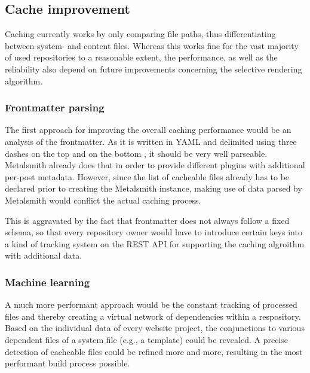 \subsection{Cache improvement}
\label{sec:outlook-cacheimprovement}

Caching currently works by only comparing file paths, thus differentiating between system- and content files. Whereas this works fine for the vast majority of used repositories to a reasonable extent, the performance, as well as the reliability also depend on future improvements concerning the selective rendering algorithm.

\subsubsection{Frontmatter parsing}
The first approach for improving the overall caching performance would be an analysis of the frontmatter. As it is written in YAML and delimited using three dashes on the top and on the bottom \cite[77]{dhillon2016}, it should be very well parseable. Metalsmith already does that in order to provide different plugins with additional per-post metadata. However, since the list of cacheable files already has to be declared prior to creating the Metalsmith instance, making use of data parsed by Metalsmith would conflict the actual caching process.

This is aggravated by the fact that frontmatter does not always follow a fixed schema, so that every repository owner would have to introduce certain keys into a kind of tracking system on the REST API for supporting the caching algroithm with additional data.

\subsubsection{Machine learning}
\label{sec:chacheimprovement-machinelearning}
A much more performant approach would be the constant tracking of processed files and thereby creating a virtual network of dependencies within a respository. Based on the individual data of every website project, the conjunctions to various dependent files of a system file (e.g., a template) could be revealed. A precise detection of cacheable files could be refined more and more, resulting in the most performant build process possible.
